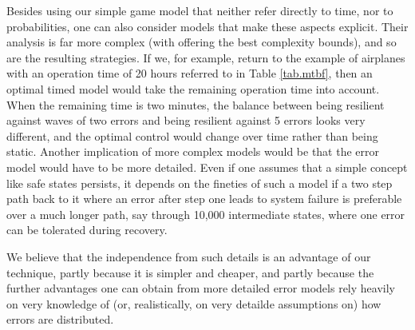 Besides using our simple game model that neither refer directly to time, nor to probabilities, one can also consider models that make these aspects explicit.
Their analysis is far more complex (with \cite{FRSZ11} offering the best complexity bounds), and so are the resulting strategies.
If we, for example, return to the example of airplanes with an operation time of 20 hours referred to in Table \ref{tab.mtbf}, then an optimal timed model would take the remaining operation time into account.
When the remaining time is two minutes, the balance between being resilient against waves of two errors and being resilient against 5 errors looks very different, and the optimal control would change over time rather than being static.
Another implication of more complex models would be that the error model would have to be more detailed.
Even if one assumes that a simple concept like safe states persists, it depends on the fineties of such a model if a two step path back to it where an error after step one leads to system failure is preferable over a much longer path, say through 10,000 intermediate states, where one error can be tolerated during recovery.

We believe that the independence from such details is an advantage of our technique, partly because it is simpler and cheaper, and partly because the further advantages one can obtain from more detailed error models rely heavily on very knowledge of (or, realistically, on very detailde assumptions on) how errors are distributed.
\label{reply1.prob.more.complex}  


